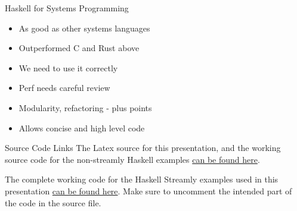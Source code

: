 \documentclass[17pt]{beamer}
\begin{document}
\begin{frame}{Haskell for Systems Programming}{}
\begin{itemize}
  \item As good as other systems languages
  \item Outperformed C and Rust above
  \item We need to use it correctly
  \item Perf needs careful review
  \item Modularity, refactoring - plus points
  \item Allows concise and high level code
\end{itemize}
\end{frame}

\begin{frame}{Source Code Links}
  The Latex source for this presentation, and the working source code
  for the non-streamly Haskell examples
  \href{https://github.com/composewell/fnconf-2025-directory-traversal}
  {can be found here}.

  The complete working code for the Haskell Streamly examples used in this presentation
  \href{https://github.com/composewell/streamly-examples/blob/aec56f4e4481e97330aa5ce4324cd1a2d2b3c2bd/examples/ListDir.hs}
  {can be found here}. Make sure to uncomment the intended part of the code in
  the source file.
\end{frame}

\begin{frame}{}
\end{frame}

\end{document}
